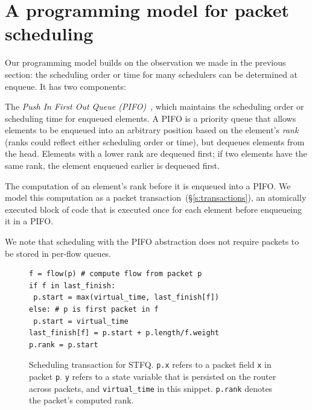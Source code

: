 \section{A programming model for packet scheduling}
\label{s:pifo}

Our programming model builds on the observation we made in the previous
section: the scheduling order or time for many schedulers can be determined at
enqueue. It has two components:
\begin{CompactEnumerate}
\item The {\em Push In First Out Queue (PIFO)}~\cite{pifo}, which maintains the
scheduling order or scheduling time for enqueued elements. A PIFO is a priority
queue that allows elements to be enqueued into an arbitrary position based on
the element's {\em rank} (ranks could reflect either scheduling order or time),
but dequeues elements from the head. Elements with a lower rank are dequeued
first; if two elements have the same rank, the element enqueued earlier is
dequeued first.

\item The computation of an element's rank before it is enqueued into
  a PIFO. We model this computation as a packet
    transaction~(\S\ref{s:transactions}), an atomically executed block
  of code that is executed once for each element before enqueueing it
  in a PIFO.
\end{CompactEnumerate}

We note that scheduling with the PIFO abstraction does not require packets to
be stored in per-flow queues.

\begin{figure}
\begin{lstlisting}[style=customc]
f = flow(p) # compute flow from packet p
if f in last_finish:
 p.start = max(virtual_time, last_finish[f])
else: # p is first packet in f
 p.start = virtual_time
last_finish[f] = p.start + p.length/f.weight
p.rank = p.start
\end{lstlisting}
\caption{Scheduling transaction for STFQ. {\tt p.x} refers to a packet
  field {\tt x} in packet {\tt p}.  {\tt y} refers to a state variable
  that is persisted on the router across packets, 
  and {\tt virtual\_time} in this snippet. {\tt p.rank} denotes the
  packet's computed rank.}
\label{fig:sched_trans}
\end{figure}

